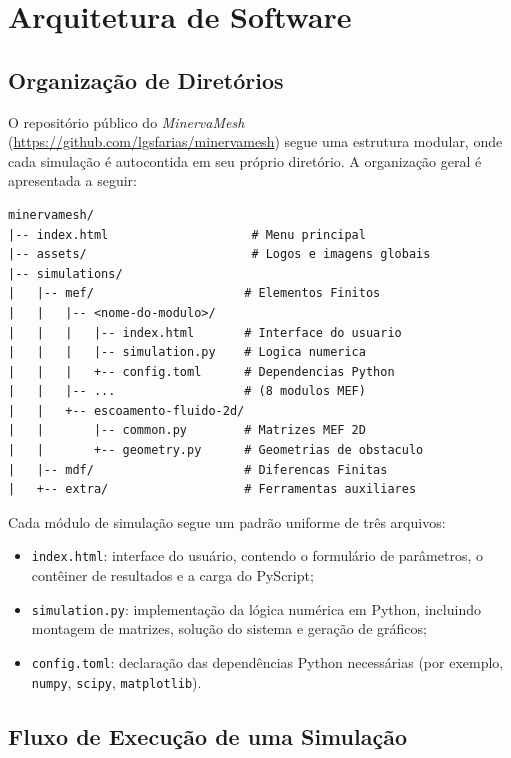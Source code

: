 \section{Arquitetura de Software}
\label{sec:arquitetura_software}

\subsection{Organização de Diretórios}
\label{sec:organizacao_diretorios}

O repositório público do \textit{MinervaMesh} (\url{https://github.com/lgsfarias/minervamesh}) segue uma estrutura modular, onde cada simulação é autocontida em seu próprio diretório. A organização geral é apresentada a seguir:

\begin{lstlisting}[style=dirstyle,numbers=none]
minervamesh/
|-- index.html                    # Menu principal
|-- assets/                       # Logos e imagens globais
|-- simulations/
|   |-- mef/                     # Elementos Finitos
|   |   |-- <nome-do-modulo>/
|   |   |   |-- index.html       # Interface do usuario
|   |   |   |-- simulation.py    # Logica numerica
|   |   |   +-- config.toml      # Dependencias Python
|   |   |-- ...                  # (8 modulos MEF)
|   |   +-- escoamento-fluido-2d/
|   |       |-- common.py        # Matrizes MEF 2D
|   |       +-- geometry.py      # Geometrias de obstaculo
|   |-- mdf/                     # Diferencas Finitas
|   +-- extra/                   # Ferramentas auxiliares
\end{lstlisting}

Cada módulo de simulação segue um padrão uniforme de três arquivos:
\begin{itemize}
    \item \texttt{index.html}: interface do usuário, contendo o formulário de parâmetros, o contêiner de resultados e a carga do PyScript;
    \item \texttt{simulation.py}: implementação da lógica numérica em Python, incluindo montagem de matrizes, solução do sistema e geração de gráficos;
    \item \texttt{config.toml}: declaração das dependências Python necessárias (por exemplo, \texttt{numpy}, \texttt{scipy}, \texttt{matplotlib}).
\end{itemize}

\subsection{Fluxo de Execução de uma Simulação}
\label{sec:fluxo_execucao}

